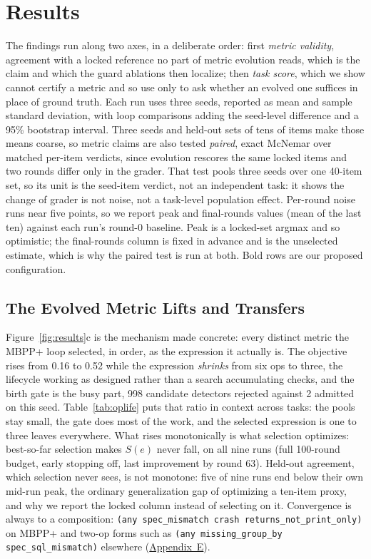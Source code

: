 \documentclass[letterpaper]{article} %
\begin{document}
\section{Results}

The findings run along two axes, in a deliberate order: first \emph{metric validity}, agreement with a locked reference no part of metric evolution reads, which is the claim and which the guard ablations then localize; then \emph{task score}, which we show cannot certify a metric and so use only to ask whether an evolved one suffices in place of ground truth. Each run uses three seeds, reported as mean and sample standard deviation, with loop comparisons adding the seed-level difference and a 95\% bootstrap interval. Three seeds and held-out sets of tens of items make those means coarse, so metric claims are also tested \emph{paired}, exact McNemar over matched per-item verdicts, since evolution rescores the same locked items and two rounds differ only in the grader. That test pools three seeds over one 40-item set, so its unit is the seed-item verdict, not an independent task: it shows the change of grader is not noise, not a task-level population effect. Per-round noise runs near five points, so we report peak and final-rounds values (mean of the last ten) against each run's round-0 baseline. Peak is a locked-set argmax and so optimistic; the final-rounds column is fixed in advance and is the unselected estimate, which is why the paired test is run at both. Bold rows are our proposed configuration.

\subsection{The Evolved Metric Lifts and Transfers}

Figure~\ref{fig:results}c is the mechanism made concrete: every distinct metric the MBPP+ loop selected, in order, as the expression it actually is. The objective rises from 0.16 to 0.52 while the expression \emph{shrinks} from six ops to three, the lifecycle working as designed rather than a search accumulating checks, and the birth gate is the busy part, 998 candidate detectors rejected against 2 admitted on this seed. Table~\ref{tab:oplife} puts that ratio in context across tasks: the pools stay small, the gate does most of the work, and the selected expression is one to three leaves everywhere. What rises monotonically is what selection optimizes: best-so-far selection makes $S(e)$ never fall, on all nine runs (full 100-round budget, early stopping off, last improvement by round 63). Held-out agreement, which selection never sees, is not monotone: five of nine runs end below their own mid-run peak, the ordinary generalization gap of optimizing a ten-item proxy, and why we report the locked column instead of selecting on it. Convergence is always to a composition: \texttt{(any spec\_mismatch crash returns\_not\_print\_only)} on MBPP+ and two-op forms such as \texttt{(any missing\_group\_by spec\_sql\_mismatch)} elsewhere (\hyperref[app:artifacts]{Appendix~E}).
\end{document}
